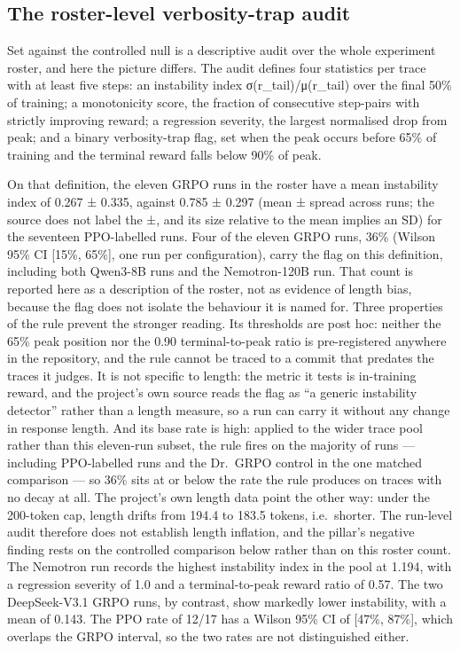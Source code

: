 \documentclass[12pt,a4paper]{report}
\begin{document}
\subsection{The roster-level verbosity-trap
audit}\label{the-roster-level-verbosity-trap-audit}

Set against the controlled null is a descriptive audit over the whole
experiment roster, and here the picture differs. The audit defines four
statistics per trace with at least five steps: an instability index
σ(r\_tail)/\textbar μ(r\_tail)\textbar{} over the final 50\% of
training; a monotonicity score, the fraction of consecutive step-pairs
with strictly improving reward; a regression severity, the largest
normalised drop from peak; and a binary verbosity-trap flag, set when
the peak occurs before 65\% of training and the terminal reward falls
below 90\% of peak.

On that definition, the eleven GRPO runs in the roster have a mean
instability index of 0.267 ± 0.335, against 0.785 ± 0.297 (mean ± spread
across runs; the source does not label the ±, and its size relative to
the mean implies an SD) for the seventeen PPO-labelled runs. Four of the
eleven GRPO runs, 36\% (Wilson 95\% CI {[}15\%, 65\%{]}, one run per
configuration), carry the flag on this definition, including both
Qwen3-8B runs and the Nemotron-120B run. That count is reported here as
a description of the roster, not as evidence of length bias, because the
flag does not isolate the behaviour it is named for. Three properties of
the rule prevent the stronger reading. Its thresholds are post hoc:
neither the 65\% peak position nor the 0.90 terminal-to-peak ratio is
pre-registered anywhere in the repository, and the rule cannot be traced
to a commit that predates the traces it judges. It is not specific to
length: the metric it tests is in-training reward, and the project's own
source reads the flag as ``a generic instability detector'' rather than
a length measure, so a run can carry it without any change in response
length. And its base rate is high: applied to the wider trace pool
rather than this eleven-run subset, the rule fires on the majority of
runs --- including PPO-labelled runs and the Dr.~GRPO control in the one
matched comparison --- so 36\% sits at or below the rate the rule
produces on traces with no decay at all. The project's own length data
point the other way: under the 200-token cap, length drifts from 194.4
to 183.5 tokens, i.e.~shorter. The run-level audit therefore does not
establish length inflation, and the pillar's negative finding rests on
the controlled comparison below rather than on this roster count. The
Nemotron run records the highest instability index in the pool at 1.194,
with a regression severity of 1.0 and a terminal-to-peak reward ratio of
0.57. The two DeepSeek-V3.1 GRPO runs, by contrast, show markedly lower
instability, with a mean of 0.143. The PPO rate of 12/17 has a Wilson
95\% CI of {[}47\%, 87\%{]}, which overlaps the GRPO interval, so the
two rates are not distinguished either.
\end{document}
